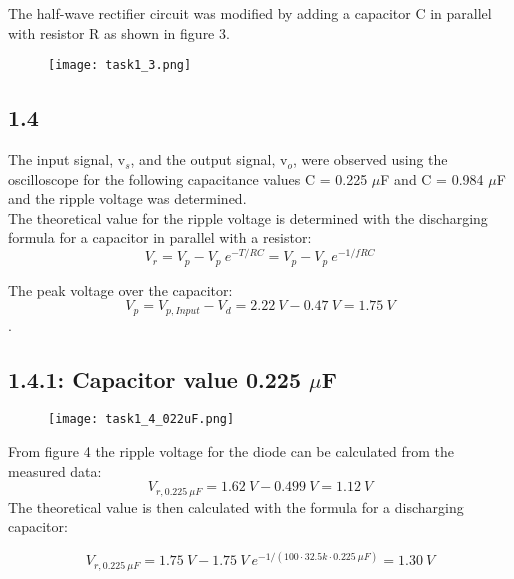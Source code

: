     The half-wave rectifier circuit was modified by adding a capacitor C in parallel with resistor R as shown in figure 3.

    \begin{figure}[h!]
        \centering
        \texttt{[image: task1\_3.png]}
    \end{figure}

\subsection*{1.4}
    
    The input signal, v$_s$, and the output signal, v$_o$, were observed using the oscilloscope for the following capacitance values C = 0.225 $\mu$F and C = 0.984 $\mu$F and the ripple voltage was determined.\\
    
    The theoretical value for the ripple voltage is determined with the discharging formula for a capacitor in parallel with a resistor:
    $$ V_r = V_p - V_p \ e^{-T/RC} =  V_p - V_p \ e^{-1/fRC}$$ 
    
    The peak voltage over the capacitor:
     $$ V_p = V_{p,Input} - V_d = 2.22 \ V - 0.47 \ V = 1.75 \ V$$.

\subsection*{1.4.1: Capacitor value 0.225 \textbf{$\mu$}F}    
    \begin{figure}[h!]
        \centering
        \texttt{[image: task1\_4\_022uF.png]}
    \end{figure}
    
    From figure 4 the ripple voltage for the diode can be calculated from the measured data: $$ V_{r,0.225 \ \mu F} = 1.62 \ V - 0.499 \ V = 1.12 \ V $$
     The theoretical value is then calculated with the formula for a discharging capacitor:
    
     $$ V_{r,0.225 \ \mu F} = 1.75 \ V - 1.75 \ V \ e^{-1/(100 \cdot 32.5k \cdot 0.225 \ \mu F)} = 1.30 \ V $$\\
\pagebreak
